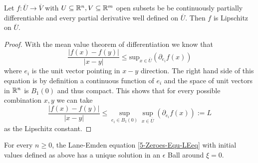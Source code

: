 \begin{lemma}
	\label{5-Zeroes-Lem-Lipschitz-Continuity-Differentiable}
	Let $f:\overline{U}\rightarrow \overline{V}$ with $U\subseteq\mathbb{R}^n,V\subseteq\mathbb{R}^m$ open subsets be be continuously partially differentiable and every partial derivative well defined on $\overline{U}$.
	Then $f$ is Lipschitz on $\overline{U}$.
\end{lemma}
\begin{proof}
	With the mean value theorem of differentiation we know that
	\begin{equation}
		\frac{|f(x)-f(y)|}{|x-y|}\leq \mathrm{sup}_{x\in\overline{U}}\left(\partial_{e_i}f(x)\right)
	\end{equation}
	where $e_i$ is the unit vector pointing in $x-y$ direction.
	The right hand side of this equation is by definition a continuous function of $e_i$ and the space of unit vectors in $\mathbb{R}^n$ is $B_1(0)$ and thus compact.
	This shows that for every possible combination $x,y$ we can take
	\begin{equation}
		\frac{|f(x)-f(y)|}{|x-y|}\leq \sup_{e_i\in B_1(0)}\sup_{x\in\overline{U}}\left(\partial_{e_i}f(x)\right):=L
	\end{equation}
	as the Lipschitz constant.
\end{proof}
\begin{lemma}
	\label{5-Zeroes-Lem-Lane-EmdenFiniteBoundary1}
	For every $n\geq0$, the Lane-Emden equation \ref{5-Zeroes-Equ-LEeq} with initial values defined as above has a unique solution in an $\epsilon$ Ball around $\xi=0$.
\end{lemma}
